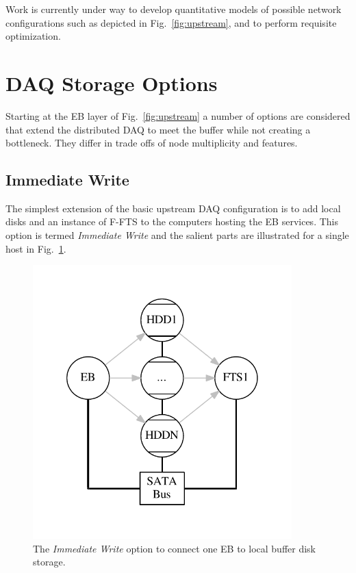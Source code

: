 \documentclass[pdftex,12pt,letter]{article}
\begin{document}
Work is currently under way to develop quantitative models of possible
network configurations such as depicted in Fig.~\ref{fig:upstream},
and to perform requisite optimization.


\section{DAQ Storage Options}

Starting at the EB layer of Fig.~\ref{fig:upstream} a number of
options are considered that extend the distributed DAQ to meet the
buffer while not creating a bottleneck.  They differ in trade offs of
node multiplicity and features.

\subsection{Immediate Write}

The simplest extension of the basic upstream DAQ configuration is to
add local disks and an instance of F-FTS to the computers hosting the
EB services.  This option is termed \textit{Immediate Write} and the salient
parts are illustrated for a single host in Fig.~\ref{fig:immediate}.

\begin{figure}[htbp]
  \centering
  \includegraphics[width=10cm]{../figures/eb2ld.pdf}
  \caption{The \textit{Immediate Write} option to connect one EB to local
    buffer disk storage.}
  \label{fig:immediate}
\end{figure}
\end{document}
